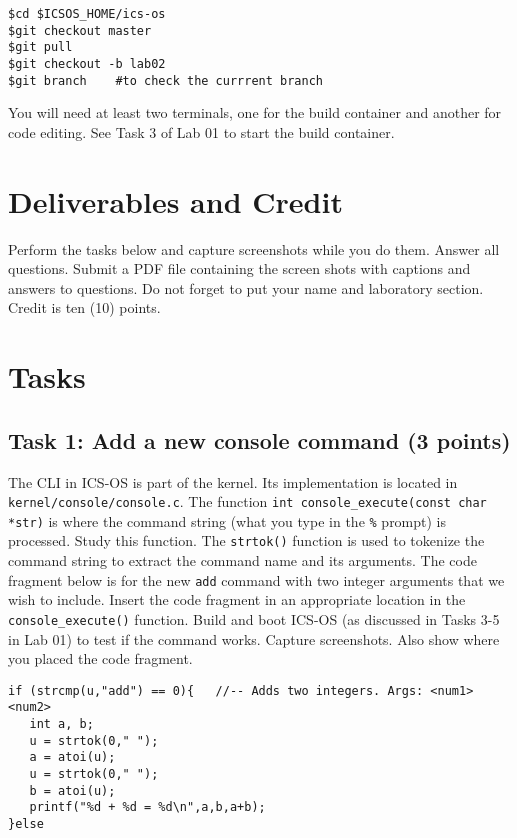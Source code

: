 \documentclass[a4paper, 11pt,oneside]{article}
\begin{document}
\begin{verbatim}
$cd $ICSOS_HOME/ics-os
$git checkout master
$git pull
$git checkout -b lab02
$git branch    #to check the currrent branch
\end{verbatim}

You will need at least two terminals, one for the build container and another 
for code editing. See Task 3 of Lab 01 to start the build container.

\section{Deliverables and Credit}
Perform the tasks below and capture screenshots while you do them. Answer
all questions. Submit a PDF file containing the screen shots with captions
and answers to questions. Do not forget to put your name and laboratory
section.  Credit is ten (10) points.

\section{Tasks}

\subsection*{Task 1: Add a new console command (3 points)} 
The CLI in ICS-OS is part of the kernel. Its implementation is located in
\texttt{kernel/console/console.c}. The function \texttt{int 
console\_execute(const char *str)} is where the command string (what you type
in the \texttt{\%} prompt) is processed. Study this function. The 
\texttt{strtok()} function is used to tokenize the command string to extract
the command name and its arguments. The code fragment below is for the new
\texttt{add} command with two integer arguments that we wish to include.
Insert the code fragment in an appropriate location in the 
\texttt{console\_execute()} function. Build and boot ICS-OS (as discussed in 
Tasks 3-5 in Lab 01) to test if the command works. Capture screenshots. Also 
show where you placed the code fragment. 

\begin{verbatim}
if (strcmp(u,"add") == 0){   //-- Adds two integers. Args: <num1> <num2> 
   int a, b; 
   u = strtok(0," "); 
   a = atoi(u);
   u = strtok(0," "); 
   b = atoi(u); 
   printf("%d + %d = %d\n",a,b,a+b); 
}else
\end{verbatim}
\end{document}
